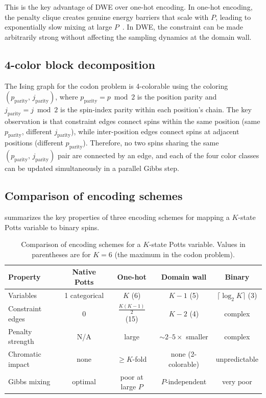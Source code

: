 \documentclass[11pt]{article}
\begin{document}
This is the key advantage of DWE over one-hot encoding.
In one-hot encoding, the penalty clique creates genuine energy barriers that scale with $P$, leading to exponentially slow mixing at large $P$~\cite{berwald2022dwc, levin2009markov}.
In DWE, the constraint can be made arbitrarily strong without affecting the sampling dynamics at the domain wall.

\subsection*{4-color block decomposition}

The Ising graph for the codon problem is 4-colorable using the coloring $(p_{\mathrm{parity}},\, j_{\mathrm{parity}})$, where $p_{\mathrm{parity}} = p \bmod 2$ is the position parity and $j_{\mathrm{parity}} = j \bmod 2$ is the spin-index parity within each position's chain.
The key observation is that constraint edges connect spins within the same position (same $p_{\mathrm{parity}}$, different $j_{\mathrm{parity}}$), while inter-position edges connect spins at adjacent positions (different $p_{\mathrm{parity}}$).
Therefore, no two spins sharing the same $(p_{\mathrm{parity}},\, j_{\mathrm{parity}})$ pair are connected by an edge, and each of the four color classes can be updated simultaneously in a parallel Gibbs step.

\subsection*{Comparison of encoding schemes}

 summarizes the key properties of three encoding schemes for mapping a $K$-state Potts variable to binary spins.

\begin{table}[H]
\centering
\caption{Comparison of encoding schemes for a $K$-state Potts variable. Values in parentheses are for $K=6$ (the maximum in the codon problem).}
\label{tab:encodings}
\vspace{2mm}
\begin{tabular}{lcccc}
\toprule
Property & Native Potts & One-hot & Domain wall & Binary \\
\midrule
Variables & 1 categorical & $K$ (6) & $K{-}1$ (5) & $\lceil\log_2 K\rceil$ (3) \\
Constraint edges & 0 & $\frac{K(K{-}1)}{2}$ (15) & $K{-}2$ (4) & complex \\
Penalty strength & N/A & large & ${\sim}2$--$5\times$ smaller & complex \\
Chromatic impact & none & $\geq K$-fold & none (2-colorable) & unpredictable \\
Gibbs mixing & optimal & poor at large $P$ & $P$-independent & very poor \\
\bottomrule
\end{tabular}
\end{table}
\end{document}
